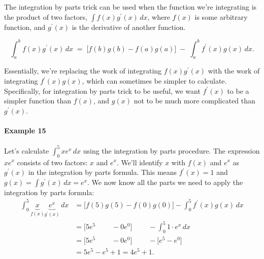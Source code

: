 			The integration by parts trick can be used
			when the function we're integrating is the product of two factors,
			$\int f(x)g^{\prime\!}(x)\, dx$,
			where $f(x)$ is some arbitrary function,
			and $g^{\prime\!}(x)$ is the derivative of another function.

			\vspace{-2mm}
			\begin{shadebox}
			\vspace{-1mm}
			\[
				\int_a^b \!\! f(x)g^{\prime\!}(x)\, dx
					\; = \;	
					\big[f(b)g(b) - f(a)g(a)\big] \; -  \; \int_a^b \!\! f^{\prime\!}(x)g(x) \, dx.
			\]
			\vspace{-2mm}
			\end{shadebox}	
			\vspace{-2mm}
			
			\noindent
			Essentially,
			we're replacing the work of integrating $f(x)g^{\prime\!}(x)$
			with the work of integrating $f^{\prime\!}(x)g(x)$,
			which can sometimes be simpler to calculate.
			Specifically,
			for integration by parts trick to be useful,
			we want $f^{\prime\!}(x)$ to be a simpler function than $f(x)$,
			and $g(x)$ not to be much more complicated than $g^{\prime\!}(x)$.

			\paragraph{Example 15}

				Let's calculate $\int_0^5 x e^x \, dx$ using the integration by parts procedure.
				The expression $x e^x$ consists of two factors: $x$ and $e^x$.
				We'll identify $x$ with $f(x)$ and $e^x$ as $g^{\prime\!}(x)$
				in the integration by parts formula.
				This means $f^{\prime\!}(x) = 1$
				and $g(x)  = \int g^{\prime\!}(x)\,dx = e^x$.
				We now know all the parts we need to apply the integration by parts formula:
				\begin{align*}
					\int_0^5 \underbrace{x}_{f(x)} \underbrace{e^x}_{g^{\prime\!}(x)} \, dx
						&= \big[f(5)g(5)  - f(0)g(0)\big]	- \int_0^5 \!\! f^{\prime\!}(x)g(x) \, dx			\\[-4mm]
						&= \big[ 5 e^5 \qquad \; - 0e^0 \big] \qquad \; - \int_0^5 1 \cdot e^x \, dx  	\\
						&= \big[ 5 e^5 \qquad\; - 0e^0 \big] \qquad \; - \big[  e^5 - e^0 \big] 						\\
						&= 5 e^5 - e^5 + 1  = 4e^5 + 1.
				\end{align*}


